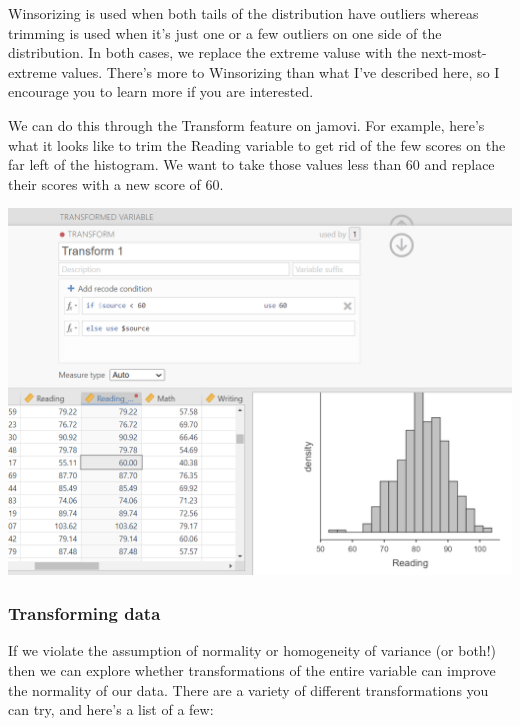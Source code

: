 \documentclass[
]{book}
\begin{document}
Winsorizing is used when both tails of the distribution have outliers whereas trimming is used when it's just one or a few outliers on one side of the distribution. In both cases, we replace the extreme valuse with the next-most-extreme values. There's more to Winsorizing than what I've described here, so I encourage you to learn more if you are interested.

We can do this through the Transform feature on jamovi. For example, here's what it looks like to trim the Reading variable to get rid of the few scores on the far left of the histogram. We want to take those values less than 60 and replace their scores with a new score of 60.

\includegraphics{images/03-jamovi/winsorize.png}

\hypertarget{transforming-data}{%
\subsubsection{Transforming data}\label{transforming-data}}

If we violate the assumption of normality or homogeneity of variance (or both!) then we can explore whether transformations of the entire variable can improve the normality of our data. There are a variety of different transformations you can try, and here's a list of a few:
\end{document}
